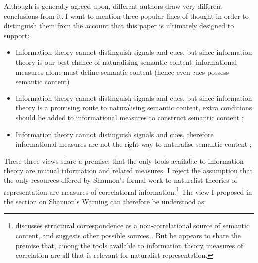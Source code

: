 


Although \ait{} is generally agreed upon, different authors draw very different conclusions from it.
I want to mention three popular lines of thought in order to distinguish them from the account that this paper is ultimately designed to support:

\begin{itemize}
    \item Information theory cannot distinguish signals and cues, but since information theory is our best chance of naturalising semantic content, informational measures alone must define semantic content (hence even cues possess semantic content) \citep{skyrms2010signals,isaac2018semantics}
    \item Information theory cannot distinguish signals and cues, but since information theory is a promising route to naturalising semantic content, extra conditions should be added to informational measures to construct semantic content \citep[$\S$3-4]{shea2018representation}; \citep[pp. 6-9,34-36]{neander2017mark}
    \item Information theory cannot distinguish signals and cues, therefore informational measures are not the right way to naturalise semantic content \citep{lean2014shannon}; \citep[$\S$4]{hutto2013radicalizing} 
\end{itemize}

\noindent These three views share a premise: that the only tools available to information theory are mutual information and related measures.
I reject the assumption that the only resources offered by Shannon's formal work to naturalist theories of representation are measures of correlational information.\footnote{\citet[$\S$5]{shea2018representation} discusses structural correspondence as a non-correlational source of semantic content, and suggests other possible sources \citep[p. 76 n. 1]{shea2018representation}. But he appears to share the premise that, among the tools available to information theory, measures of correlation are all that is relevant for naturalist representation.}
The view I proposed in the section on Shannon's Warning can therefore be understood as:

